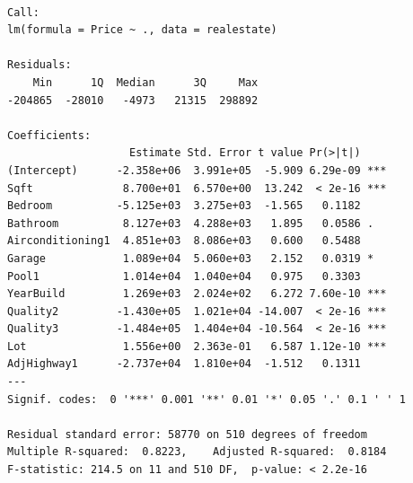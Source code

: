 \documentclass[]{article}
\begin{document}
\begin{verbatim}

Call:
lm(formula = Price ~ ., data = realestate)

Residuals:
    Min      1Q  Median      3Q     Max 
-204865  -28010   -4973   21315  298892 

Coefficients:
                   Estimate Std. Error t value Pr(>|t|)    
(Intercept)      -2.358e+06  3.991e+05  -5.909 6.29e-09 ***
Sqft              8.700e+01  6.570e+00  13.242  < 2e-16 ***
Bedroom          -5.125e+03  3.275e+03  -1.565   0.1182    
Bathroom          8.127e+03  4.288e+03   1.895   0.0586 .  
Airconditioning1  4.851e+03  8.086e+03   0.600   0.5488    
Garage            1.089e+04  5.060e+03   2.152   0.0319 *  
Pool1             1.014e+04  1.040e+04   0.975   0.3303    
YearBuild         1.269e+03  2.024e+02   6.272 7.60e-10 ***
Quality2         -1.430e+05  1.021e+04 -14.007  < 2e-16 ***
Quality3         -1.484e+05  1.404e+04 -10.564  < 2e-16 ***
Lot               1.556e+00  2.363e-01   6.587 1.12e-10 ***
AdjHighway1      -2.737e+04  1.810e+04  -1.512   0.1311    
---
Signif. codes:  0 '***' 0.001 '**' 0.01 '*' 0.05 '.' 0.1 ' ' 1

Residual standard error: 58770 on 510 degrees of freedom
Multiple R-squared:  0.8223,    Adjusted R-squared:  0.8184 
F-statistic: 214.5 on 11 and 510 DF,  p-value: < 2.2e-16
\end{verbatim}

\newpage
\end{document}
